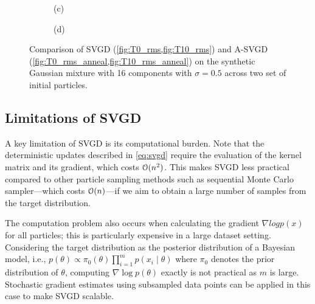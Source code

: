 \begin{figure}[t!]
\begin{subfigure}[b]{.48\textwidth}
    \caption{(c)\label{fig:T0_rms_anneal}}
\end{subfigure}
\hfill
\centering
\begin{subfigure}[b]{0.48\textwidth}
    \caption{(d)\label{fig:T10_rms_anneal}}
\end{subfigure}
\caption{Comparison of SVGD (\cref{fig:T0_rms,fig:T10_rms}) and A-SVGD (\cref{fig:T0_rms_anneal,fig:T10_rms_anneal}) on the synthetic Gaussian mixture with 16 components with $\sigma = 0.5$ across two set of initial particles. }
\label{fig:SVGD_ASVGD}
\end{figure}









\subsection{Limitations of SVGD} 

A key limitation of SVGD is its
computational burden. Note that the deterministic updates described in \cref{eq:svgd} require the
evaluation of the kernel matrix and its gradient, which costs $\mathcal{O}(n^2)$.
This makes SVGD less practical compared to other particle sampling methods
such as sequential Monte Carlo sampler---which costs $\mathcal{O}(n)$---if we aim to
obtain a large number of samples from the target distribution.

The computation problem also occurs when calculating the gradient $\nabla log
p(x)$ for all particles; this is particularly expensive in a large dataset
setting. Considering the target distribution as the posterior distribution
of a Bayesian model, i.e., $p(\theta) \propto \pi_0(\theta)\prod_{i = 1}^{m}
p(x_i \mid \theta)$ where $\pi_0$ denotes the prior distribution of $\theta$,
computing $\nabla \log p(\theta)$ exactly is not practical as $m$ is large.
Stochastic gradient estimates using subsampled data points can be applied in this case to make SVGD scalable.


